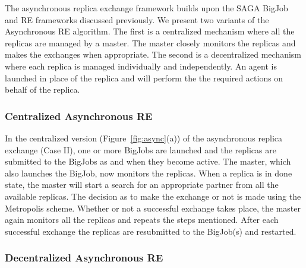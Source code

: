 \documentclass[a4paper,10pt]{article}
\newcommand{\alnote}[1]{ {\textcolor{blue} { ***andre: #1 }}}
\newcommand{\athotanote}[1]{ {\textcolor{green} { ***athota: #1 }}}
\newcommand{\alnote}[1]{}
\newcommand{\athotanote}[1]{}
\begin{document}
The asynchronous replica exchange framework builds upon the SAGA BigJob and RE frameworks discussed previously.
We present two variants of the Asynchronous RE algorithm. The first is a centralized 
mechanism where all the replicas are managed by a master. The master closely monitors the replicas and makes the exchanges when appropriate. 
The second is a decentralized mechanism where each replica is managed individually and independently. An agent is launched in place of the replica and will perform the the required actions on behalf of the replica.


\subsubsection{Centralized Asynchronous RE}



In the centralized version (Figure~\ref{fig:async}(a)) of the
asynchronous replica exchange (Case II), one or more BigJobs are
launched and the replicas are submitted to the BigJobs as and when
they become active. The master, which also launches the BigJob, now
monitors the replicas. When a replica is in done state, the master
will start a search for an appropriate partner from all the available
replicas. The decision as to make the exchange or not is made using
the Metropolis scheme.  Whether or not a successful exchange takes
place, the master again monitors all the replicas and repeats the
steps mentioned.  After each successful exchange the replicas are
resubmitted to the BigJob(s) and restarted.

\subsubsection{Decentralized Asynchronous RE}
\end{document}
